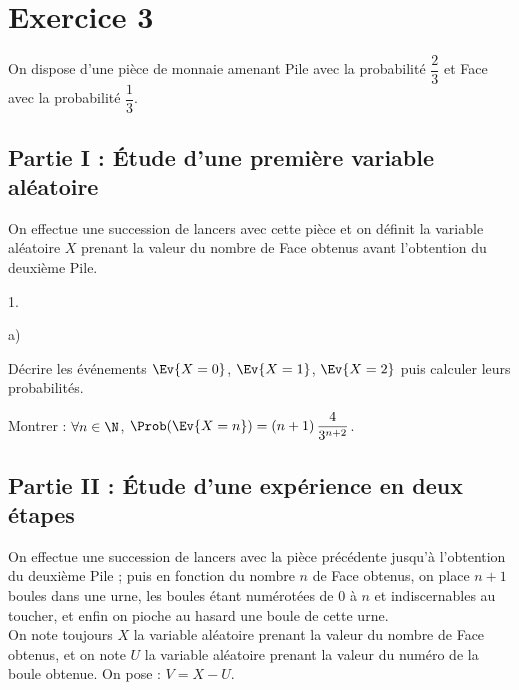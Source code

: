 \section*{Exercice 3}

\noindent
On dispose d'une pièce de monnaie amenant Pile avec la probabilité 
$\dfrac{2}{3}$ et Face avec la probabilité $\dfrac{1}{3}$.

\subsection*{Partie I : Étude d'une première variable aléatoire}

\noindent
On effectue une succession de lancers avec cette pièce et on définit la 
variable aléatoire $X$ prenant la valeur du nombre de Face obtenus 
avant l'obtention du deuxième Pile.

\begin{noliste}{1.}
  \setlength{\itemsep}{4mm}
  \item 
  \begin{noliste}{a)}
    \setlength{\itemsep}{2mm}
    \item Décrire les événements $\Ev{X=0}$, $\Ev{X=1}$, $\Ev{X=2}$
    puis calculer leurs probabilités.
    
    

    
    \item Montrer : $\forall n \in \N$, $\Prob(\Ev{X=n}) = (n+1) \,
    \dfrac{4}{3^{n+2}}$.
    
    
  \end{noliste}
\end{noliste}



\subsection*{Partie II : Étude d'une expérience en deux étapes}

\noindent
On effectue une succession de lancers avec la pièce précédente jusqu'à 
l'obtention du deuxième Pile ; puis en fonction du nombre $n$ de Face 
obtenus, on place $n+1$ boules dans une urne, les boules étant 
numérotées de $0$ à $n$ et indiscernables au toucher, et enfin on 
pioche au hasard une boule de cette urne.\\[.1cm]
On note toujours $X$ la variable aléatoire prenant la valeur du nombre 
de Face obtenus, et on note $U$ la variable aléatoire prenant la valeur 
du numéro de la boule obtenue. On pose : $V=X-U$.

